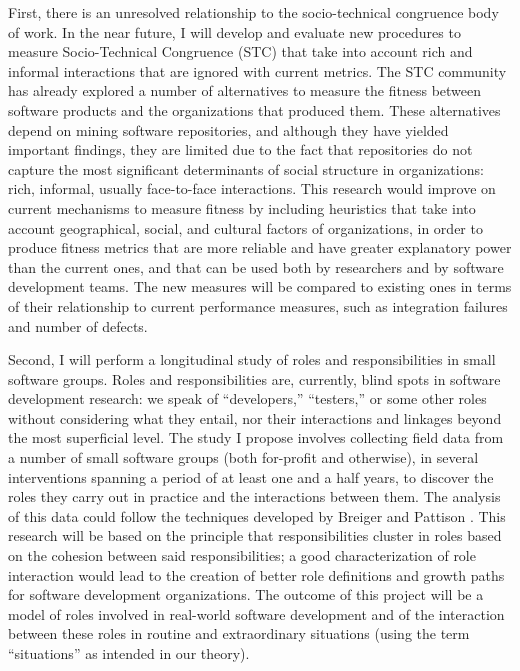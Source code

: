 First, there is an unresolved relationship to the socio-technical congruence body of work. In the near future, I will develop and evaluate new procedures to measure Socio-Technical Congruence (STC) that take into account rich and informal interactions that are ignored with current metrics. The STC community has already explored a number of alternatives to measure the fitness between software products and the organizations that produced them. These alternatives depend on mining software repositories, and although they have yielded important findings, they are limited due to the fact that repositories do not capture the most significant determinants of social structure in organizations: rich, informal, usually face-to-face interactions. This research would improve on current mechanisms to measure fitness by including heuristics that take into account geographical, social, and cultural factors of organizations, in order to produce fitness metrics that are more reliable and have greater explanatory power than the current ones, and that can be used both by researchers and by software development teams. The new measures will be compared to existing ones in terms of their relationship to current performance measures, such as integration failures and number of defects.

Second, I will perform a longitudinal study of roles and responsibilities in small software groups. Roles and responsibilities are, currently, blind spots in software development research: we speak of ``developers,'' ``testers,'' or some other roles without considering what they entail, nor their interactions and linkages beyond the most superficial level. The study I propose involves collecting field data from a number of small software groups (both for-profit and otherwise), in several interventions spanning a period of at least one and a half years, to discover the roles they carry out in practice and the interactions between them. The analysis of this data could follow the techniques developed by Breiger and Pattison . This research will be based on the principle that responsibilities cluster in roles based on the cohesion between said responsibilities; a good characterization of role interaction would lead to the creation of better role definitions and growth paths for software development organizations. The outcome of this project will be a model of roles involved in real-world software development and of the interaction between these roles in routine and extraordinary situations (using the term ``situations'' as intended in our theory).

